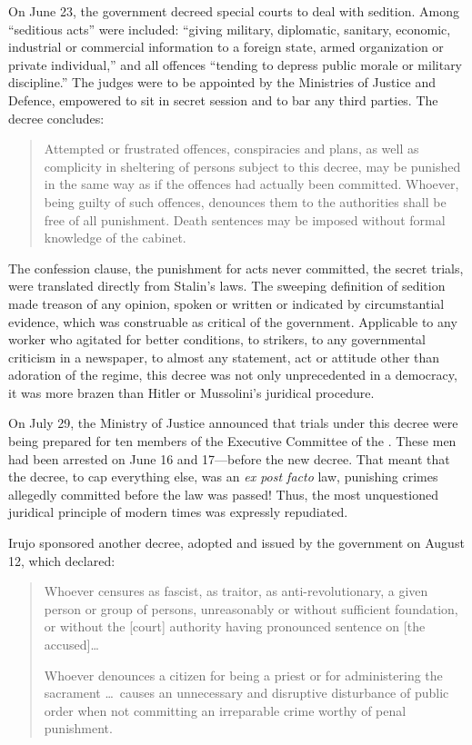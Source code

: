 On June 23, the government decreed special courts to deal with sedition. Among ``seditious acts'' were included: ``giving military, diplomatic, sanitary, economic, industrial or commercial information to a foreign state, armed organization or private individual,'' and all offences ``tending to depress public morale or military discipline.'' The judges were to be appointed by the Ministries of Justice and Defence, empowered to sit in secret session and to bar any third parties. The decree concludes:

\begin{quotation}
  Attempted or frustrated offences, conspiracies and plans, as well as complicity in sheltering of persons subject to this decree, may be punished in the same way as if the offences had actually been committed. Whoever, being guilty of such offences, denounces them to the authorities shall be free of all punishment. Death sentences may be imposed without formal knowledge of the cabinet.
\end{quotation}

The confession clause, the punishment for acts never committed, the secret trials, were translated directly from Stalin’s laws. The sweeping definition of sedition made treason of any opinion, spoken or written or indicated by circumstantial evidence, which was construable as critical of the government. Applicable to any worker who agitated for better conditions, to strikers, to any governmental criticism in a newspaper, to almost any statement, act or attitude other than adoration of the regime, this decree was not only unprecedented in a democracy, it was more brazen than Hitler or Mussolini’s juridical procedure.
\noclub

On July 29, the Ministry of Justice announced that trials under this decree were being prepared for ten members of the Executive Committee of the \POUM. These men had been arrested on June 16 and 17---before the new decree. That meant that the decree, to cap everything else, was an \emph{ex post facto} law, punishing crimes allegedly committed before the law was passed! Thus, the most unquestioned juridical principle of modern times was expressly repudiated.

Irujo sponsored another decree, adopted and issued by the government on August 12, which declared:

\begin{quotation}
  \begin{sloppypar}
  Whoever censures as fascist, as traitor, as anti-revolutionary, a given person or group of persons, unreasonably or without sufficient foundation, or without the [court] authority having pronounced sentence on [the accused]\dots
  \end{sloppypar}
  
  Whoever denounces a citizen for being a priest or for administering the sacrament \dots\ causes an unnecessary and disruptive disturbance of public order when not committing an irreparable crime worthy of penal punishment.
\end{quotation}

